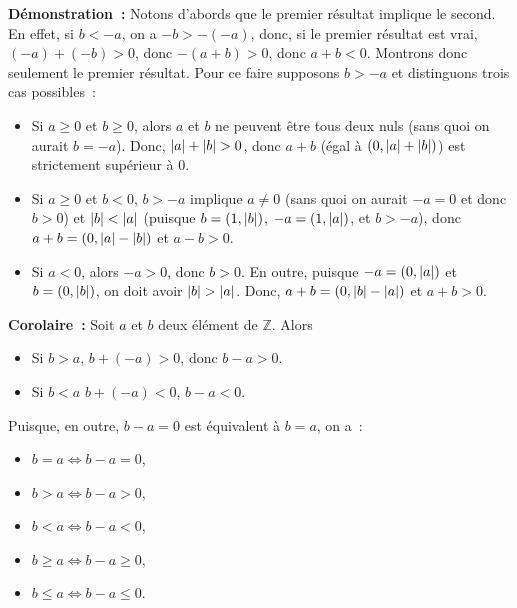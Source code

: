 \medskip

\noindent\textbf{Démonstration :} Notons d'abords que le premier résultat implique le second. 
    En effet, si $b < -a$, on a $-b > -(-a)$, donc, si le premier résultat est vrai, $(-a) + (-b) > 0$, donc $- (a+b) > 0$, donc $a + b < 0$.
    Montrons donc seulement le premier résultat. 
    Pour ce faire supposons $b > -a$ et distinguons trois cas possibles : 
    \begin{itemize}[nosep]
        \item Si $a \geq 0$ et $b \geq 0$, alors $a$ et $b$ ne peuvent être tous deux nuls (sans quoi on aurait $b = -a$).
            Donc, $\left\lvert a \right\rvert + \left\lvert b \right\rvert > 0$, donc $a + b$ (égal à $(0, \left\lvert a \right\rvert + \left\lvert b \right\rvert)$) est strictement supérieur à $0$.
        \item Si $a \geq 0$ et $b < 0$, $b > -a$ implique $a \neq 0$ (sans quoi on aurait $-a = 0$ et donc $b > 0$) et $\left\lvert b \right\rvert < \left\lvert a \right\rvert$ (puisque $b = (1, \left\lvert b \right\rvert)$, $-a = (1, \left\lvert a \right\rvert)$, et $b > -a$), donc $a + b = (0, \left\lvert a \right\rvert - \left\lvert b \right\rvert)$ et $a-b > 0$.
        \item Si $a < 0$, alors $-a > 0$, donc $b > 0$. 
            En outre, puisque $-a = (0, \left\lvert a \right\rvert)$ et $b = (0, \left\lvert b \right\rvert)$, on doit avoir $\left\lvert b \right\rvert > \left\lvert a \right\rvert$. 
            Donc, $a + b = (0, \left\lvert b \right\rvert - \left\lvert a \right\rvert)$ et $a + b > 0$.
    \end{itemize}

    \done

\medskip

\noindent\textbf{Corolaire :} Soit $a$ et $b$ deux élément de $\mathbb{Z}$. 
    Alors 
    \begin{itemize}[nosep]
        \item Si $b > a$, $b + (-a) > 0$, donc $b - a > 0$.
        \item Si $b < a$ $b + (-a) < 0$, $b - a < 0$.
    \end{itemize}
    Puisque, en outre, $b - a = 0$ est équivalent à $b = a$, on a : 
    \begin{itemize}[nosep]
        \item $b = a \Leftrightarrow b - a = 0$,
        \item $b > a \Leftrightarrow b - a > 0$,
        \item $b < a \Leftrightarrow b - a < 0$,
        \item $b \geq a \Leftrightarrow b - a \geq 0$,
        \item $b \leq a \Leftrightarrow b - a \leq 0$.
    \end{itemize}

